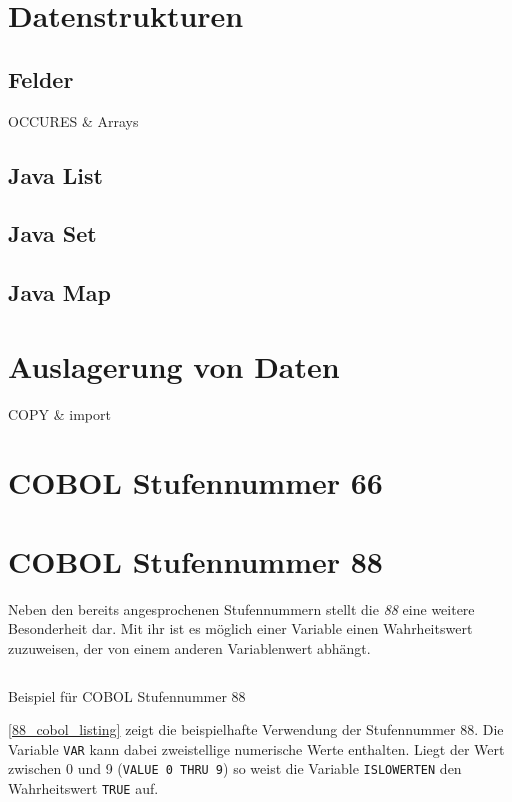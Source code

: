 \section{Datenstrukturen}

\subsection{Felder}
OCCURES \& Arrays

\subsection{Java List}

\subsection{Java Set}

\subsection{Java Map}

\section{Auslagerung von Daten}
COPY \& import

\section{COBOL Stufennummer 66}

\clearpage
\section{COBOL Stufennummer 88}
Neben den bereits angesprochenen Stufennummern stellt die \textit{88} eine weitere Besonderheit dar. Mit ihr ist es möglich einer Variable einen Wahrheitswert zuzuweisen, der von einem anderen Variablenwert abhängt. 

\begin{listing}[H]
  \inputminted[bgcolor=mintedgrey,xleftmargin=20pt,linenos,fontsize=\footnotesize]{cobol}{code/88_section.cbl.txt}
  \caption{Beispiel für COBOL Stufennummer 88}
  \label{88_cobol_listing}
\end{listing} 

\autoref{88_cobol_listing} zeigt die beispielhafte Verwendung der Stufennummer 88. Die Variable \texttt{VAR} kann dabei zweistellige numerische Werte enthalten. Liegt der Wert zwischen 0 und 9 (\texttt{VALUE 0 THRU 9}) so weist die Variable \texttt{ISLOWERTEN} den Wahrheitswert \texttt{TRUE} auf.

